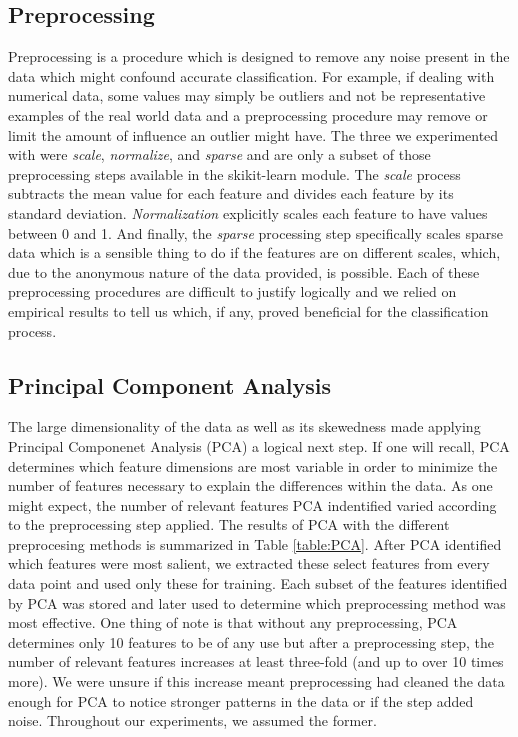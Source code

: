 \documentclass[11pt]{article}
\begin{document}
\subsection{Preprocessing}
Preprocessing is a procedure which is designed to remove any noise present in 
the data which might confound accurate classification. For example, if dealing 
with numerical data, some values may simply be outliers and not be 
representative examples of the real world data and a preprocessing 
procedure may remove or limit the amount of influence an outlier might have.
The three we experimented with were \textit{scale}, \textit{normalize}, and 
\textit{sparse} and are only a subset of those preprocessing steps available 
in the skikit-learn module. The \textit{scale} process subtracts the 
mean value for each feature and divides each feature by its standard deviation. \textit{Normalization} explicitly scales each feature to have values between 0 
and 1. And finally, the \textit{sparse} processing step specifically scales 
sparse data which is a sensible thing to do if the features are on different 
scales, which, due to the anonymous nature of the data provided, is possible. 
Each of these preprocessing procedures are difficult to justify logically and 
we relied on empirical results to tell us which, if any, proved beneficial for 
the classification process. 

\subsection{Principal Component Analysis}
The large dimensionality of the data as well as its skewedness made applying 
Principal Componenet Analysis (PCA) a logical next step. If one will recall, 
PCA determines which feature dimensions are most variable in order to minimize 
the number of features necessary to explain the differences within the data. 
As one might expect, the number of relevant features PCA indentified varied 
according to the preprocessing step applied. The results of PCA with the 
different preprocesing methods is summarized in Table \ref{table:PCA}. After 
PCA identified which features were most salient, we extracted these select 
features from every data point and used only these for training. Each 
subset of the features identified by PCA was stored and later used to 
determine which preprocessing method was most effective. One thing of note 
is that without any preprocessing, PCA determines only 10 features to be 
of any use but after a preprocessing step, the number of relevant features 
increases at least three-fold (and up to over 10 times more). We were unsure
if this increase meant preprocessing had cleaned the data enough for PCA 
to notice stronger patterns in the data or if the step added noise. Throughout 
our experiments, we assumed the former.
\end{document}
